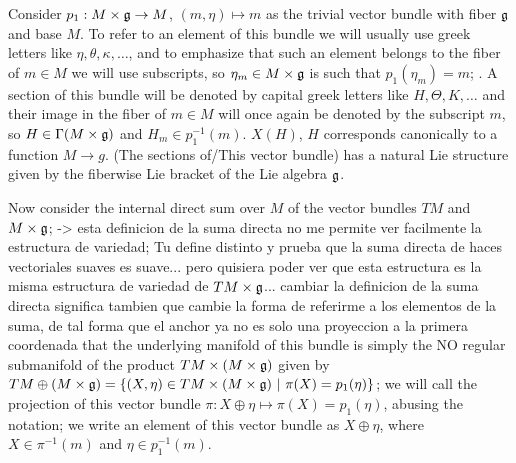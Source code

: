 Consider $p_1: M \times \mathfrak{g} \to M$, $(m, \eta) \mapsto m$ as the trivial vector bundle with fiber $\mathfrak{g}$ and base $M$. To refer to an element of this bundle we will usually use greek letters like $\eta, \theta, \kappa, \dots$, and to emphasize that such an element belongs to the fiber of $m \in M$ we will use subscripts, so $\eta_m \in M \times \mathfrak{g}$ is such that $p_1(\eta_m) = m$; . A section of this bundle will be denoted by capital greek letters like $H, \Theta, K, \dots$ and their image in the fiber of $m \in M$ will once again be denoted by the subscript $m$, so $H \in \Gamma(M \times \mathfrak{g})$ and $H_m \in p_1^{-1}(m)$. $X(H)$, $H$ corresponds canonically to a function $M \to g$. (The sections of/This vector bundle) has a natural Lie structure given by the fiberwise Lie bracket of the Lie algebra $\mathfrak{g}$.

Now consider the internal direct sum over $M$ of the vector bundles $TM$ and $M \times \mathfrak{g}$; -> esta definicion de la suma directa no me permite ver facilmente la estructura de variedad; Tu define distinto y prueba que la suma directa de haces vectoriales suaves es suave... pero quisiera poder ver que esta estructura es la misma estructura de variedad de $TM \times \mathfrak{g}$... cambiar la definicion de la suma directa significa tambien que cambie la forma de referirme a los elementos de la suma, de tal forma que el anchor ya no es solo una proyeccion a la primera coordenada  that the underlying manifold of this bundle is simply the NO regular submanifold of the product $TM \times (M \times \mathfrak{g})$ given by $TM \oplus (M \times \mathfrak{g}) = \left\{ (X, \eta) \in TM \times (M \times \mathfrak{g}) \ |\  \pi(X) = p_1(\eta) \right\}$; we will call the projection of this vector bundle $\pi: X \oplus \eta \mapsto \pi(X) = p_1(\eta)$, abusing the notation; we write an element of this vector bundle as $X \oplus \eta$, where $X \in \pi^{-1}(m)$ and $\eta \in p_1^{-1}(m)$.

